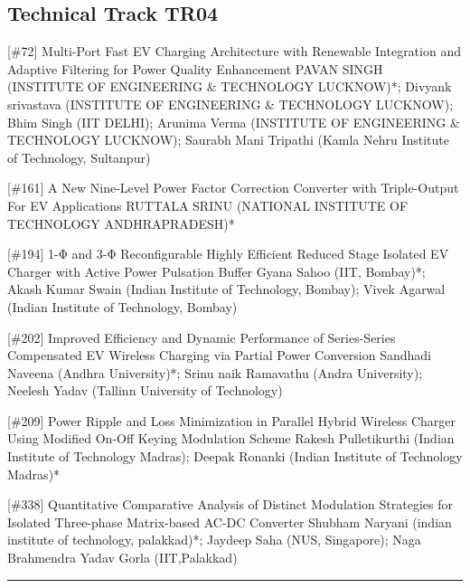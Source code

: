 \subsection{Technical Track TR04}\nopagebreak {} \begin{abstract_online} {[\#72] Multi-Port Fast EV Charging Architecture with Renewable Integration and Adaptive Filtering for Power Quality Enhancement } {} {PAVAN SINGH (INSTITUTE OF ENGINEERING \& TECHNOLOGY LUCKNOW)*; Divyank srivastava (INSTITUTE OF ENGINEERING \& TECHNOLOGY LUCKNOW); Bhim Singh (IIT DELHI); Arunima  Verma (INSTITUTE OF ENGINEERING \& TECHNOLOGY LUCKNOW); Saurabh Mani Tripathi (Kamla Nehru Institute of Technology, Sultanpur)} {}  \end{abstract_online} 
{} \begin{abstract_online} {[\#161] A New Nine-Level Power Factor Correction Converter with Triple-Output For EV Applications } {} {RUTTALA SRINU (NATIONAL INSTITUTE OF TECHNOLOGY ANDHRAPRADESH)*} {}  \end{abstract_online} 
{} \begin{abstract_online} {[\#194] 1-Φ and 3-Φ Reconfigurable Highly Efficient Reduced Stage Isolated EV Charger with Active Power Pulsation Buffer} {} {Gyana Sahoo (IIT, Bombay)*; Akash Kumar  Swain (Indian Institute of Technology, Bombay); Vivek Agarwal (Indian Institute of Technology, Bombay)} {}  \end{abstract_online} 
{} \begin{abstract_online} {[\#202] Improved Efficiency and Dynamic Performance of Series-Series Compensated EV Wireless Charging via Partial Power Conversion} {} {Sandhadi Naveena (Andhra University)*; Srinu naik Ramavathu (Andra University); Neelesh Yadav (Tallinn University of Technology)} {}  \end{abstract_online} 
{} \begin{abstract_online} {[\#209] Power Ripple and Loss Minimization in Parallel Hybrid Wireless Charger Using Modified On-Off Keying Modulation Scheme} {} {Rakesh  Pulletikurthi (Indian Institute of Technology Madras); Deepak  Ronanki (Indian Institute of Technology Madras)*} {}  \end{abstract_online} 
{} \begin{abstract_online} {[\#338] Quantitative Comparative Analysis of Distinct Modulation Strategies for Isolated Three-phase Matrix-based AC-DC Converter} {} {Shubham Naryani (indian institute of technology, palakkad)*; Jaydeep  Saha (NUS, Singapore); Naga Brahmendra  Yadav Gorla (IIT,Palakkad)} {}  \end{abstract_online} 
\hrule
